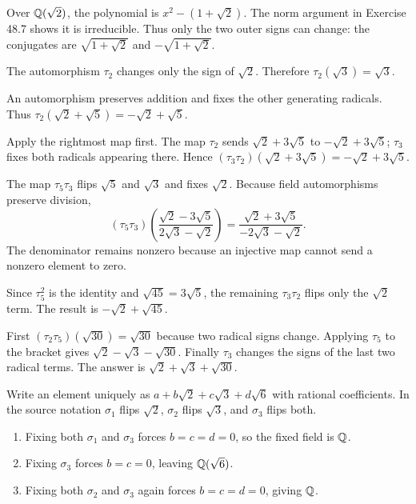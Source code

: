 Over $\mathbb{Q}(\sqrt2)$, the polynomial is $x^2-(1+\sqrt2)$. The norm argument in Exercise 48.7 shows it is irreducible. Thus only the two outer signs can change: the conjugates are $\sqrt{1+\sqrt2}$ and $-\sqrt{1+\sqrt2}$.

The automorphism $\tau_2$ changes only the sign of $\sqrt2$. Therefore $\tau_2(\sqrt3)=\sqrt3$.

An automorphism preserves addition and fixes the other generating radicals. Thus $\tau_2(\sqrt2+\sqrt5)=-\sqrt2+\sqrt5$.

Apply the rightmost map first. The map $\tau_2$ sends $\sqrt2+3\sqrt5$ to $-\sqrt2+3\sqrt5$; $\tau_3$ fixes both radicals appearing there. Hence $(\tau_3\tau_2)(\sqrt2+3\sqrt5)=-\sqrt2+3\sqrt5$.

The map $\tau_5\tau_3$ flips $\sqrt5$ and $\sqrt3$ and fixes $\sqrt2$. Because field automorphisms preserve division,
\[(\tau_5\tau_3)\left(\frac{\sqrt2-3\sqrt5}{2\sqrt3-\sqrt2}\right)=\frac{\sqrt2+3\sqrt5}{-2\sqrt3-\sqrt2}.\]
The denominator remains nonzero because an injective map cannot send a nonzero element to zero.

Since $\tau_5^2$ is the identity and $\sqrt{45}=3\sqrt5$, the remaining $\tau_3\tau_2$ flips only the $\sqrt2$ term. The result is $-\sqrt2+\sqrt{45}$.

First $(\tau_2\tau_5)(\sqrt{30})=\sqrt{30}$ because two radical signs change. Applying $\tau_5$ to the bracket gives $\sqrt2-\sqrt3-\sqrt{30}$. Finally $\tau_3$ changes the signs of the last two radical terms. The answer is $\sqrt2+\sqrt3+\sqrt{30}$.

Write an element uniquely as $a+b\sqrt2+c\sqrt3+d\sqrt6$ with rational coefficients. In the source notation $\sigma_1$ flips $\sqrt2$, $\sigma_2$ flips $\sqrt3$, and $\sigma_3$ flips both.
\begin{enumerate}[label=(\alph*)]
\item Fixing both $\sigma_1$ and $\sigma_3$ forces $b=c=d=0$, so the fixed field is $\mathbb{Q}$.
\item Fixing $\sigma_3$ forces $b=c=0$, leaving $\mathbb{Q}(\sqrt6)$.
\item Fixing both $\sigma_2$ and $\sigma_3$ again forces $b=c=d=0$, giving $\mathbb{Q}$.
\end{enumerate}

